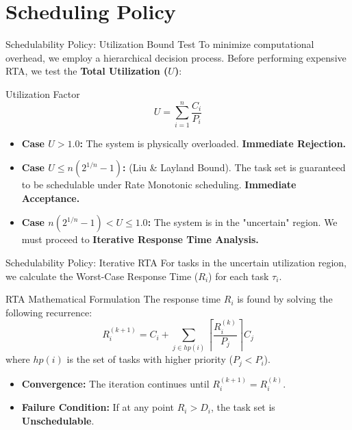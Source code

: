 \section{Scheduling Policy}
\begin{frame}{Schedulability Policy: Utilization Bound Test}
    To minimize computational overhead, we employ a hierarchical decision process. Before performing expensive RTA, we test the \textbf{Total Utilization ($U$)}:
    
    \begin{block}{Utilization Factor}
        $$U = \sum_{i=1}^{n} \frac{C_i}{P_i}$$
    \end{block}

    \begin{itemize}
        \item \textbf{Case $U > 1.0$:} The system is physically overloaded. \textbf{Immediate Rejection.}
        \item \textbf{Case $U \le n(2^{1/n}-1)$:} (Liu \& Layland Bound). The task set is guaranteed to be schedulable under Rate Monotonic scheduling. \textbf{Immediate Acceptance.}
        \item \textbf{Case $n(2^{1/n}-1) < U \le 1.0$:} The system is in the "uncertain" region. We must proceed to \textbf{Iterative Response Time Analysis.}
    \end{itemize}
\end{frame}

\begin{frame}{Schedulability Policy: Iterative RTA}
    For tasks in the uncertain utilization region, we calculate the Worst-Case Response Time ($R_i$) for each task $\tau_i$.
    
    \begin{alertblock}{RTA Mathematical Formulation}
        The response time $R_i$ is found by solving the following recurrence:
        $$R_i^{(k+1)} = C_i + \sum_{j \in hp(i)} \left\lceil \frac{R_i^{(k)}}{P_j} \right\rceil C_j$$
        where $hp(i)$ is the set of tasks with higher priority ($P_j < P_i$).
    \end{alertblock}

    \begin{itemize}
        \item \textbf{Convergence:} The iteration continues until $R_i^{(k+1)} = R_i^{(k)}$.
        \item \textbf{Failure Condition:} If at any point $R_i > D_i$, the task set is \textbf{Unschedulable}.
    \end{itemize}
\end{frame}

